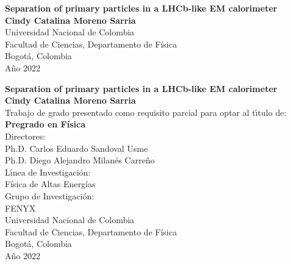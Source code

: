 \begin{center}
\begin{figure}
\centering%
%
\end{figure}
\thispagestyle{empty} \vspace*{2.0cm} \textbf{\huge
Separation of primary particles in a LHCb-like EM calorimeter}\\[6.0cm]
\Large\textbf{Cindy Catalina Moreno Sarria}\\[6.0cm]
\small Universidad Nacional de Colombia\\
Facultad de Ciencias, Departamento de Física\\
Bogotá, Colombia\\
A\~{n}o 2022\\
\end{center}

\newpage{\pagestyle{empty}\cleardoublepage}

\newpage
\begin{center}
\thispagestyle{empty} \vspace*{0cm} \textbf{\huge
Separation of primary particles in a LHCb-like EM calorimeter}\\[2.5cm]
\Large\textbf{Cindy Catalina Moreno Sarria}\\[2.5cm]
\small Trabajo de grado presentado como requisito parcial para optar al
t\'{\i}tulo de:\\
\textbf{Pregrado en Física}\\[2.0cm]
Directores:\\
Ph.D. Carlos Eduardo Sandoval Usme\\
Ph.D. Diego Alejandro Milanés Carreño\\[2.0cm]
L\'{\i}nea de Investigaci\'{o}n:\\
Física de Altas Energías\\
Grupo de Investigaci\'{o}n:\\
FENYX\\[2.0cm]
Universidad Nacional de Colombia\\
Facultad de Ciencias, Departamento de Física\\
Bogotá, Colombia\\
A\~{n}o 2022\\
\end{center}

\newpage{\pagestyle{empty}\cleardoublepage}

\newpage
\thispagestyle{empty} \textbf{}\normalsize


